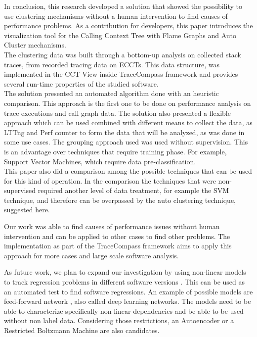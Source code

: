 In conclusion, this research developed a solution that showed the possibility to use clustering mechanisms without a human intervention to find causes of performance problems. As a contribution for developers, this  paper  introduces  the  visualization  tool  for  the  Calling Context Tree with Flame Graphs and Auto Cluster mechanisms. \\
The clustering data was built through a bottom-up analysis on collected stack traces, from recorded tracing data on ECCTs. This data structure, was implemented in the CCT View inside TraceCompass framework and provides several run-time properties of the studied software.\\
The solution presented an automated algorithm done with an heuristic comparison. This approach is the first one to be done on performance analysis on trace executions and call graph data. The solution also presented a flexible approach which can be used combined with different means to collect the data, as LTTng and Perf counter to form the data that will be analyzed, as was done in some use cases.
The grouping approach used was used  without supervision. This is an advantage over techniques that require training phase. For example, Support Vector Machines, which require data pre-classification. \\

This paper also did a comparison among the possible techniques that can be used for this kind of operation. In the comparison the techniques that were non-supervised required another level of data treatment, for example the SVM technique, and therefore can be overpassed by the auto clustering technique, suggested here.

Our work was able to find causes of performance issues without human intervention and can be applied to other cases to find other problems. The implementation as part of the TraceCompass framework aims to apply this approach for more cases and large scale software analysis.

As future work, we plan to expand our investigation by using non-linear models to track regression problems in different software versions \cite{deep}. This can be used as an automated test to find software regressions. An example of possible models are feed-forward network \cite{deep}, also called deep learning networks.
The models need to be able to characterize specifically non-linear dependencies and be able to be used without non label data. Considering those restrictions, an Autoencoder or a Restricted Boltzmann Machine are also candidates.\\ 


